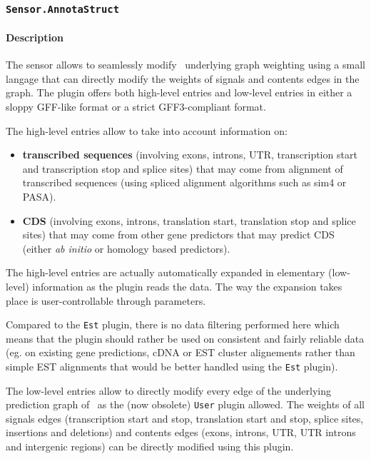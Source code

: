 
\subsubsection{\texttt{Sensor.AnnotaStruct}}
\label{annotastruct}
\paragraph{Description}

The sensor allows to seamlessly modify \EuGene\ underlying graph
weighting using a small langage that can directly modify the weights
of signals and contents edges in the graph. The plugin offers both
high-level entries and low-level entries in either a sloppy GFF-like
format or a strict GFF3-compliant format.

The high-level entries allow to take into account information on:
\begin{itemize}
\item \textbf{transcribed sequences} (involving exons, introns, UTR,
  transcription start and transcription stop and splice sites) that
  may come from alignment of transcribed sequences (using spliced
  alignment algorithms such as sim4 or PASA).
\item \textbf{CDS} (involving exons, introns, translation start,
  translation stop and splice sites) that may come from other gene
  predictors that may predict CDS (either \emph{ab initio} or homology based
  predictors).
\end{itemize}
The high-level entries are actually automatically expanded in
elementary (low-level) information as the plugin reads the data. The
way the expansion takes place is user-controllable through parameters.

Compared to the \texttt{Est} plugin, there is no data filtering
performed here which means that the plugin should rather be used on
consistent and fairly reliable data (eg. on existing gene predictions,
cDNA or EST cluster alignements rather than simple EST alignments that
would be better handled using the \texttt{Est} plugin).

The low-level entries allow to directly modify every edge of the
underlying prediction graph of \EuGene\ as the (now obsolete)
\texttt{User} plugin allowed. The weights of all signals edges
(transcription start and stop, translation start and stop, splice
sites, insertions and deletions) and contents edges (exons, introns,
UTR, UTR introns and intergenic regions) can be directly modified
using this plugin.

